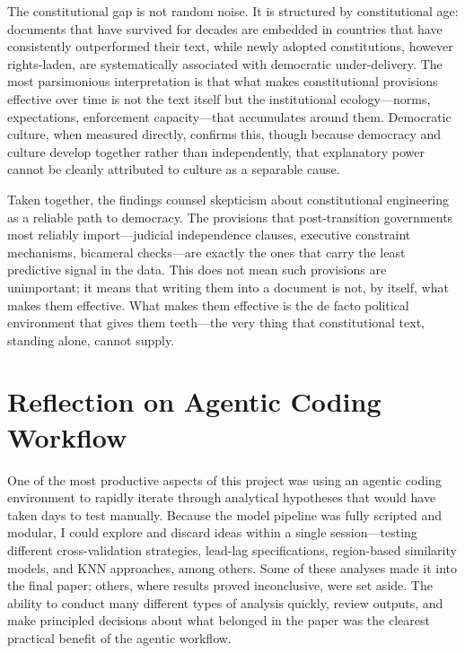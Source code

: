 \documentclass[9pt,twoside]{pnas-new}
\begin{document}
The constitutional gap is not random noise. It is structured by constitutional age: documents that have survived for decades are embedded in countries that have consistently outperformed their text, while newly adopted constitutions, however rights-laden, are systematically associated with democratic under-delivery. The most parsimonious interpretation is that what makes constitutional provisions effective over time is not the text itself but the institutional ecology---norms, expectations, enforcement capacity---that accumulates around them. Democratic culture, when measured directly, confirms this, though because democracy and culture develop together rather than independently, that explanatory power cannot be cleanly attributed to culture as a separable cause.

Taken together, the findings counsel skepticism about constitutional engineering as a reliable path to democracy. The provisions that post-transition governments most reliably import---judicial independence clauses, executive constraint mechanisms, bicameral checks---are exactly the ones that carry the least predictive signal in the data. This does not mean such provisions are unimportant; it means that writing them into a document is not, by itself, what makes them effective. What makes them effective is the de facto political environment that gives them teeth---the very thing that constitutional text, standing alone, cannot supply.


\section*{Reflection on Agentic Coding Workflow}

One of the most productive aspects of this project was using an agentic coding environment to rapidly iterate through analytical hypotheses that would have taken days to test manually. Because the model pipeline was fully scripted and modular, I could explore and discard ideas within a single session---testing different cross-validation strategies, lead-lag specifications, region-based similarity models, and KNN approaches, among others. Some of these analyses made it into the final paper; others, where results proved inconclusive, were set aside. The ability to conduct many different types of analysis quickly, review outputs, and make principled decisions about what belonged in the paper was the clearest practical benefit of the agentic workflow.
\end{document}
